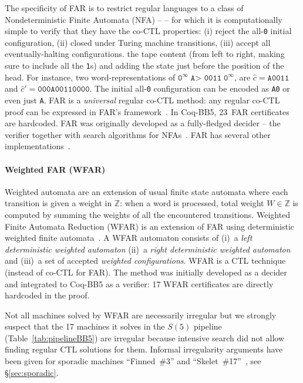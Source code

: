 \documentclass[sigconf,screen]{acmart}
\theoremstyle{definition} %
\numberwithin{equation}{section}
\theoremstyle{definition} %
\newcommand{\Z}{\mathbb{Z}}
\newcommand{\szero}{\texttt{0}\xspace}
\newcommand{\sone}{\texttt{1}\xspace}
\newcommand{\CoqBB}{Coq-BB5\xspace}
\begin{document}
The specificity of FAR is to restrict regular languages to a class of Nondeterministic Finite Automata (NFA) --  -- for which it is computationally simple to verify that they have the co-CTL properties: (i) reject the all-\szero initial configuration, (ii) closed under Turing machine transitions, (iii) accept all eventually-halting configurations.  the tape content (from left to right, making sure to include all the \sone{}s) and adding the state just before the position of the head. For instance, two word-representations of $\texttt{0}^\infty \; \texttt{A> 0011} \; \texttt{0}^\infty$, are $\hat{c} = \texttt{A0011}$ and $\hat{c}' = \texttt{000A00110000}$. The initial all-\szero configuration can be encoded as \texttt{A0} or even just \texttt{A}. FAR is a \textit{universal} regular co-CTL method: any regular co-CTL proof can be expressed in FAR's framework~\cite{bbchallenge_part1}. In \CoqBB, 23~FAR certificates are hardcoded. FAR was originally developed as a fully-fledged decider -- \ie the verifier together with search algorithms for NFAs~\cite{FAR,bbchallenge_part1}. FAR has several other implementations~\cite{FAR_Tony,FAR_cosmo}.

\paragraph{Weighted FAR (WFAR)} Weighted automata are an extension of usual finite state automata where each transition is given a weight in $\Z$: when a word is processed, total weight $W \in \Z$ is computed by summing the weights of all the encountered transitions. Weighted Finite Automata Reduction (WFAR) is an extension of FAR using deterministic weighted finite automata~\cite{iijil1_2025_14914502}. A WFAR automaton consists of (i)~a \textit{left deterministic weighted automaton} (ii)~a \textit{right deterministic weighted automaton} and (iii)~a set of accepted \textit{weighted configurations}. WFAR is a CTL technique (instead of co-CTL for FAR). The method was initially developed as a decider~\cite{iijil1_2025_14914502} and integrated to \CoqBB as a verifier: 17 WFAR certificates are directly hardcoded in the \Coq proof.

Not all machines solved by WFAR are necessarily irregular but we strongly suspect that the 17 machines it solves in the $S(5)$ pipeline (Table~\ref{tab:pipelineBB5}) are irregular because intensive search did not allow finding regular CTL solutions for them. Informal irregularity arguments have been given for sporadic machines ``Finned~\#3'' and ``Skelet~\#17''~\cite{irregularFinned3,irregularSk17}, see \S\ref{sec:sporadic}.
\end{document}
